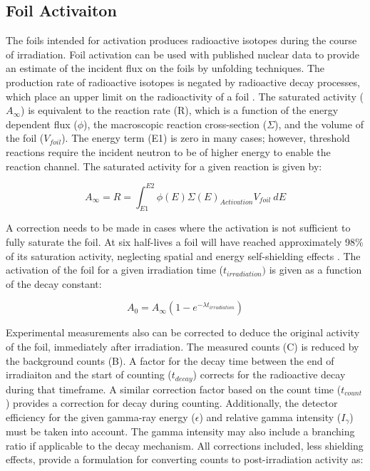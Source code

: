 \documentclass[journal]{IEEEtran}
\begin{document}
	\subsection{Foil Activaiton}
	The foils intended for activation produces radioactive isotopes during the 
	course of irradiation.  Foil activation can be used with published 
	nuclear data to provide an estimate of the incident flux on the foils by 
	unfolding techniques. The production rate of radioactive isotopes is negated 
	by radioactive decay processes, which place an upper limit on the radioactivity 
	of a foil \cite{Knoll}. The saturated activity ($A_{\infty}$) is equivalent to 
	the reaction rate (R), which is a function of the energy dependent flux 
	($\phi$), the macroscopic reaction cross-section ($\Sigma$), and the volume of 
	the foil ($V_{foil}$). The energy term (E1) is zero in many cases; however,  
	threshold reactions require the incident neutron to be of higher energy to 
	enable the reaction channel. The saturated activity for a given reaction is 
	given by: 
	
	\begin{equation} \label{eq:InfReactionRate}
	A_{\infty} = R = \int_{E1}^{E2} \phi(E) \Sigma(E) _{Activation} V_{foil} 
	\:dE 
	\end{equation}
	
	A correction needs to be made in cases where the activation is not sufficient 
	to fully saturate the foil. At six half-lives a foil will have reached 
	approximately 98\% of its saturation activity, neglecting spatial and energy 
	self-shielding effects \cite{Knoll}. The activation of the foil for a given 
	irradiation time ($t_{irradiation})$ is given as a function of the decay 
	constant: 
	
	\begin{equation} \label{eq:ReactionRate}
	A_{0} = A_{\infty}(1-e^{-\lambda t_{irradiation}}) 
	\end{equation}
	
	Experimental measurements also can be corrected to deduce the original activity 
	of the foil, immediately after irradiation. The measured counts (C) is reduced 
	by the background counts (B). A factor for the decay time between the end of 
	irradiaiton and the start of counting ($t_{decay}$) corrects for the 
	radioactive decay during that timeframe. A similar correction factor based on 
	the count time ($t_{count}$) provides a correction for decay during counting. 
	Additionally, the detector efficiency for the given gamma-ray energy 
	($\epsilon$) 
	and relative gamma intensity ($I_{\gamma}$) must be taken into account. The 
	gamma intensity may also include a branching ratio if applicable to the decay 
	mechanism. All corrections included, less shielding effects, provide a 
	formulation for converting counts to post-irradiation activity as: 
	
\end{document}
